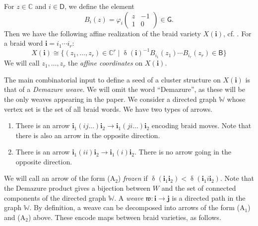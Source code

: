 \documentclass[a4paper, 11pt]{amsart}
\newcommand{\borel}{\mathsf{B}}
\newcommand{\weave}{\mathfrak{w}}
\newcommand{\words}{\mathbb{W}}
\newcommand{\word}[1]{\mathbf{#1}}
\DeclareMathOperator{\dem}{\delta}
\newcommand{\group}{\mathsf{G}}
\newcommand{\C}{\mathbb{C}}
\newcommand{\dynkin}{\mathsf{D}}
\theoremstyle{definition}
\begin{document}
For $z \in \C$ and $i \in \dynkin$, we define the element 
\[
B_i(z) = \varphi_i\begin{pmatrix} z & -1 \\ 1 & 0 \end{pmatrix} \in \group.
\]
Then we have the following affine realization of the braid variety $X(\word{i})$, cf. \cite[Section 3.4]{CGGLSS}. For a braid word $\word{i} = i_1\cdots i_r$:
\begin{equation}\label{eq:affine-realization-braid-variety}
X(\word{i}) \cong \{(z_1, \dots, z_r) \in \C^r \mid \dem(\word{i})^{-1}B_{i_1}(z_1)\cdots B_{i_r}(z_r) \in \borel\} 
\end{equation}
We will call $z_1, \dots, z_r$ the \emph{affine coordinates} on $X(\word{i})$.

The main combinatorial input to define  a seed of a cluster structure on $X(\word{i})$ is that of a \emph{Demazure weave}. We will omit the word ``Demazure'', as these will be the only weaves appearing in the paper. 
We consider a directed graph $\words$ whose vertex set is the set of all braid words. We have two types of arrows. 

\begin{enumerate}
    \item[($\mathrm{A}_1$)] There is an arrow $\word{i}_1(ij\dots)\word{i}_2 \to \word{i}_1(ji\dots)\word{i}_2$ encoding braid moves. Note that there is also an arrow in the opposite direction.
    \item[$(\mathrm{A}_2$)] There is an arrow $\word{i}_1(ii)\word{i}_2 \to \word{i}_1(i)\word{i}_2$. There is no arrow going in the opposite direction. 
\end{enumerate}

We will call an arrow of the form ($\mathrm{A}_2$) \emph{frozen} if $\dem(\word{i}_1\word{i}_2) < \dem(\word{i}_1i\word{i}_2)$. 
Note that the Demazure product gives a bijection between $W$ and the set of connected components of the directed graph $\words$. A \emph{weave} $\weave: \word{i} \to \word{j}$ is a directed path in the graph $\words$. By definition, a weave can be decomposed into arrows of the form ($\mathrm{A}_1$) and ($\mathrm{A}_2$) above. 
These encode maps between braid varieties, as follows. 
\end{document}
